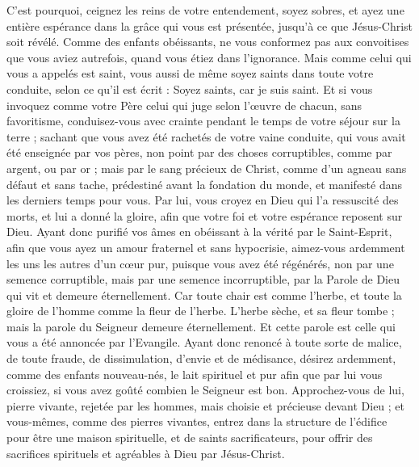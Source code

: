 \begin{multicols}{2}
C'est pourquoi, ceignez les reins de votre entendement, soyez sobres, et ayez une entière espérance dans la grâce qui vous est présentée, jusqu'à ce que Jésus-Christ soit révélé.
Comme des enfants obéissants, ne vous conformez pas aux convoitises que vous aviez autrefois, quand vous étiez dans l'ignorance.
Mais comme celui qui vous a appelés est saint, vous aussi de même soyez saints dans toute votre conduite,
selon ce qu'il est écrit : Soyez saints, car je suis saint.
Et si vous invoquez comme votre Père celui qui juge selon l'œuvre de chacun, sans favoritisme, conduisez-vous avec crainte pendant le temps de votre séjour sur la terre ;
sachant que vous avez été rachetés de votre vaine conduite, qui vous avait été enseignée par vos pères, non point par des choses corruptibles, comme par argent, ou par or ;
mais par le sang précieux de Christ, comme d'un agneau sans défaut et sans tache,
prédestiné avant la fondation du monde, et manifesté dans les derniers temps pour vous.
Par lui, vous croyez en Dieu qui l'a ressuscité des morts, et lui a donné la gloire, afin que votre foi et votre espérance reposent sur Dieu.
Ayant donc purifié vos âmes en obéissant à la vérité par le Saint-Esprit, afin que vous ayez un amour fraternel et sans hypocrisie, aimez-vous ardemment les uns les autres d'un cœur pur,
puisque vous avez été régénérés, non par une semence corruptible, mais par une semence incorruptible, par la Parole de Dieu qui vit et demeure éternellement.
Car toute chair est comme l'herbe, et toute la gloire de l'homme comme la fleur de l'herbe. L'herbe sèche, et sa fleur tombe ;
mais la parole du Seigneur demeure éternellement. Et cette parole est celle qui vous a été annoncée par l'Evangile.
\VerseOne{}Ayant donc renoncé à toute sorte de malice, de toute fraude, de dissimulation, d'envie et de médisance,
désirez ardemment, comme des enfants nouveau-nés, le lait spirituel et pur afin que par lui vous croissiez,
si vous avez goûté combien le Seigneur est bon.
Approchez-vous de lui, pierre vivante, rejetée par les hommes, mais choisie et précieuse devant Dieu ;
et vous-mêmes, comme des pierres vivantes, entrez dans la structure de l'édifice pour être une maison spirituelle, et de saints sacrificateurs, pour offrir des sacrifices spirituels et agréables à Dieu par Jésus-Christ.

\end{multicols}
